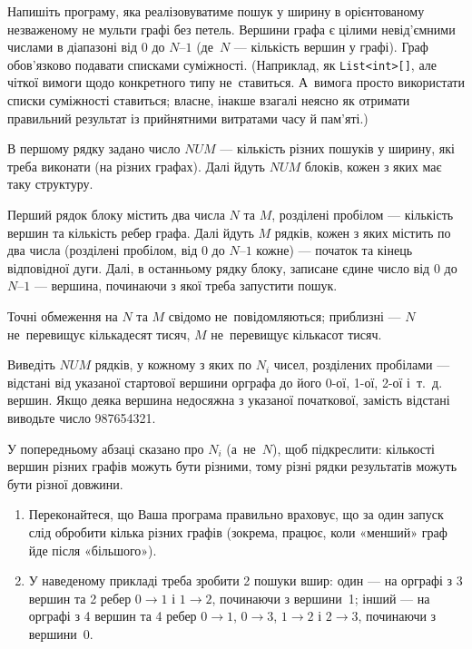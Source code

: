 ﻿ Напишіть програму, яка реалізовуватиме пошук у ширину в орієнтованому незваженому не мульти графі без петель. Вершини графа є цілими невід’ємними числами в діапазоні від 0 до $N–1$ (де~$N$ --- кількість вершин у графі). Граф обов’язково подавати списками суміжності. (Наприклад, як {\tt List<int>[]}, але чіткої вимоги щодо конкретного типу не~ставиться. А~вимога просто використати списки суміжності ставиться; власне, інакше взагалі неясно як отримати правильний результат із прийнятними витратами часу й пам'яті.)

\InputFile
В першому рядку задано число $NUM$ --- кількість різних пошуків у ширину, які треба виконати (на різних графах). Далі йдуть $NUM$ блоків, кожен з яких має таку структуру.

Перший рядок блоку містить два числа $N$ та $M$, розділені пробілом --- кількість вершин та кількість ребер графа. Далі йдуть $M$ рядків, кожен з яких містить по два числа (розділені пробілом, від 0 до $N–1$ кожне) --- початок та кінець відповідної дуги. Далі, в останньому рядку блоку, записане єдине число від 0 до $N–1$ --- вершина, починаючи з якої треба запустити пошук.

Точні обмеження на $N$ та $M$ свідомо не~повідомляються; приблизні --- $N$ не~перевищує кількадесят тисяч, $M$ не~перевищує кількасот тисяч.


\OutputFile
Виведіть $NUM$ рядків, у кожному з яких по $N_i$ чисел, розділених пробілами --- відстані від указаної стартової вершини орграфа до його 0-ої, 1-ої, 2-ої і~т.~д. вершин. Якщо деяка вершина недосяжна з указаної початкової, замість відстані виводьте число 987654321.

У попередньому абзаці сказано про $N_i$ (а~не~$N$), щоб підкреслити: кількості вершин різних графів можуть бути різними, тому різні рядки результатів можуть бути різної довжини.



\Examples

\begin{example}
\end{example}


\Note

\begin{enumerate}
\item 
Переконайтеся, що Ваша програма правильно враховує, що за один запуск слід обробити кілька різних графів (зокрема, працює, коли «менший» граф йде після «більшого»).

\item
У наведеному прикладі треба зробити 2 пошуки вшир:
один --- на орграфі з 3 вершин та 2 ребер
$0\to 1$ і
$1\to 2$,
починаючи з вершини~1;
інший --- на орграфі з 4 вершин та 4 ребер
$0\to 1$,
$0\to 3$,
$1\to 2$ і
$2\to 3$,
починаючи з вершини~0.



\end{enumerate}

